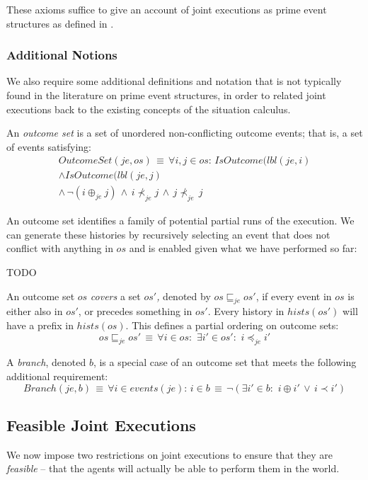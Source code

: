 These axioms suffice to give an account of joint executions as prime
event structures as defined in \citep{npw79event_structures}.


\subsubsection{Additional Notions}

We also require some additional definitions and notation that is not
typically found in the literature on prime event structures, in order
to related joint executions back to the existing concepts of the situation
calculus.

An \emph{outcome set} is a set of unordered non-conflicting outcome
events; that is, a set of events satisfying:\begin{multline*}
OutcomeSet(je,os)\,\equiv\,\forall i,j\in os:\, IsOutcome(lbl(je,i)\\
\wedge IsOutcome(lbl(je,j)\\
\wedge\,\neg(i\oplus_{je}j)\,\wedge\, i\not\prec_{je}j\,\wedge\, j\not\prec_{je}\, j\end{multline*}


An outcome set identifies a family of potential partial runs of the
execution. We can generate these histories by recursively selecting
an event that does not conflict with anything in $os$ and is enabled
given what we have performed so far:

TODO

An outcome set $os$ \emph{covers} a set \emph{$os'$,} denoted by
$os\sqsubseteq_{je}os'$, if every event in $os$ is either also in
$os'$, or precedes something in $os'$. Every history in $hists(os')$
will have a prefix in $hists(os)$. This defines a partial ordering
on outcome sets:\[
os\sqsubseteq_{je}os'\,\equiv\,\forall i\in os:\,\,\exists i'\in os':\,\, i\preceq_{je}i'\]


A \emph{branch}, denoted $b$, is a special case of an outcome set
that meets the following additional requirement:\[
Branch(je,b)\,\equiv\,\forall i\in events(je):\, i\in b\,\equiv\,\neg(\exists i'\in b:\,\, i\oplus i'\,\vee\, i\prec i')\]



\subsection{Feasible Joint Executions}

We now impose two restrictions on joint executions to ensure that
they are \emph{feasible} -- that the agents will actually be able
to perform them in the world.

